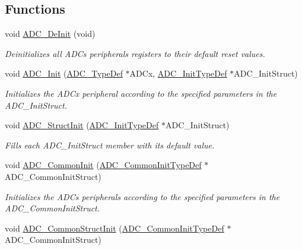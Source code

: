 \subsection*{Functions}
\begin{DoxyCompactItemize}
\item 
void \hyperlink{group___a_d_c_ga1962afdd9eebe5c896bbba2e4f26fe09}{A\+D\+C\+\_\+\+De\+Init} (void)
\begin{DoxyCompactList}\small\item\em Deinitializes all A\+D\+Cs peripherals registers to their default reset values. \end{DoxyCompactList}\item 
void \hyperlink{group___a_d_c_gabbab6038cf8691404350625e477254f9}{A\+D\+C\+\_\+\+Init} (\hyperlink{struct_a_d_c___type_def}{A\+D\+C\+\_\+\+Type\+Def} $\ast$A\+D\+Cx, \hyperlink{struct_a_d_c___init_type_def}{A\+D\+C\+\_\+\+Init\+Type\+Def} $\ast$A\+D\+C\+\_\+\+Init\+Struct)
\begin{DoxyCompactList}\small\item\em Initializes the A\+D\+Cx peripheral according to the specified parameters in the A\+D\+C\+\_\+\+Init\+Struct. \end{DoxyCompactList}\item 
void \hyperlink{group___a_d_c_ga6c6e754d1d0a98d56e465efaf73272ec}{A\+D\+C\+\_\+\+Struct\+Init} (\hyperlink{struct_a_d_c___init_type_def}{A\+D\+C\+\_\+\+Init\+Type\+Def} $\ast$A\+D\+C\+\_\+\+Init\+Struct)
\begin{DoxyCompactList}\small\item\em Fills each A\+D\+C\+\_\+\+Init\+Struct member with its default value. \end{DoxyCompactList}\item 
void \hyperlink{group___a_d_c_ga5803f6581a9cd7e90b6e637067102d94}{A\+D\+C\+\_\+\+Common\+Init} (\hyperlink{struct_a_d_c___common_init_type_def}{A\+D\+C\+\_\+\+Common\+Init\+Type\+Def} $\ast$A\+D\+C\+\_\+\+Common\+Init\+Struct)
\begin{DoxyCompactList}\small\item\em Initializes the A\+D\+Cs peripherals according to the specified parameters in the A\+D\+C\+\_\+\+Common\+Init\+Struct. \end{DoxyCompactList}\item 
void \hyperlink{group___a_d_c_gad60a6414b4932c704f6f7a7c2963fa2a}{A\+D\+C\+\_\+\+Common\+Struct\+Init} (\hyperlink{struct_a_d_c___common_init_type_def}{A\+D\+C\+\_\+\+Common\+Init\+Type\+Def} $\ast$A\+D\+C\+\_\+\+Common\+Init\+Struct)

\end{DoxyCompactItemize}
